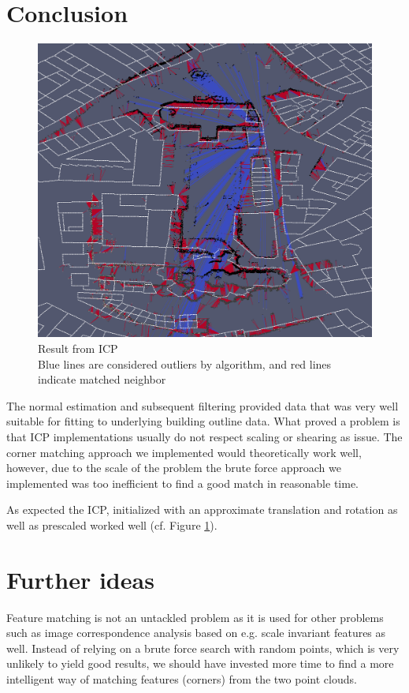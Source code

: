 \documentclass[10pt,twocolumn,letterpaper]{article}
\begin{document}
\section{Conclusion}

\begin{figure}

  \centering
  \includegraphics[width=.8\linewidth]{images/result_icp.png}
  \caption{Result from ICP\\Blue lines are considered outliers by algorithm, and red lines indicate matched neighbor}
  \label{fig:icpresult}

\end{figure}

The normal estimation and subsequent filtering provided data that was very well suitable for fitting to underlying building outline data. 
What proved a problem is that ICP implementations usually do not respect scaling or shearing as issue. The corner matching approach we implemented would theoretically work well, however, due to the scale of the problem the brute force approach we implemented was too inefficient to find a good match in reasonable time. 

As expected the ICP, initialized with an approximate translation and rotation as well as prescaled worked well (cf. Figure \ref{fig:icpresult}).

\section{Further ideas}

Feature matching is not an untackled problem as it is used for other problems such as image correspondence analysis based on e.g. scale invariant features as well. Instead of relying on a brute force search with random points, which is very unlikely to yield good results, we should have invested more time to find a more intelligent way of matching features (corners) from the two point clouds.
\end{document}
